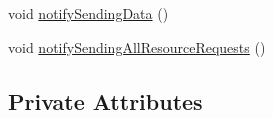 \begin{CompactItemize}
\item 
\hypertarget{classpeoParaSGATransform_4e19dfc22b6f69fa8b93537226551866}{
void \hyperlink{classpeoParaSGATransform_4e19dfc22b6f69fa8b93537226551866}{notify\-Sending\-Data} ()}
\label{classpeoParaSGATransform_4e19dfc22b6f69fa8b93537226551866}

\item 
\hypertarget{classpeoParaSGATransform_8a0316e33897c395a81787f59ea7a1c8}{
void \hyperlink{classpeoParaSGATransform_8a0316e33897c395a81787f59ea7a1c8}{notify\-Sending\-All\-Resource\-Requests} ()}
\label{classpeoParaSGATransform_8a0316e33897c395a81787f59ea7a1c8}

\end{CompactItemize}
\subsection*{Private Attributes}
